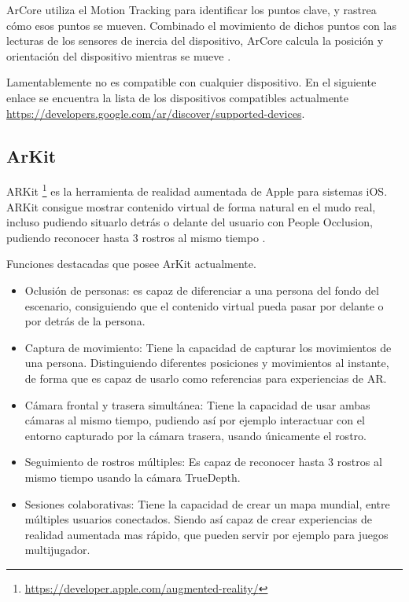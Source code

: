 ArCore utiliza el Motion Tracking para identificar los puntos clave, y rastrea cómo esos puntos se mueven. Combinado el movimiento de dichos puntos con  las lecturas de los sensores de inercia del dispositivo, ArCore calcula la posición y orientación del dispositivo mientras se mueve \cite{google}.

Lamentablemente no es compatible con cualquier dispositivo. En el siguiente enlace se encuentra la lista de los dispositivos compatibles actualmente \url{https://developers.google.com/ar/discover/supported-devices}.

\subsection{ArKit}
ARKit \footnote{\url{https://developer.apple.com/augmented-reality/}} es la herramienta de realidad aumentada de Apple para sistemas iOS. ARKit consigue mostrar contenido virtual de forma natural en el mudo real, incluso pudiendo situarlo detrás o delante del usuario con People Occlusion, pudiendo reconocer hasta 3 rostros al mismo tiempo \cite{apple_inc}.

Funciones destacadas que posee ArKit actualmente.
\begin{itemize}
	\item Oclusión de personas: es capaz de diferenciar a una persona del fondo del escenario, consiguiendo que el contenido virtual  pueda pasar por delante o por detrás de la persona.
	\item Captura de movimiento: Tiene la capacidad de capturar los movimientos de una persona. Distinguiendo diferentes posiciones y movimientos al instante, de forma que es capaz de usarlo como referencias para experiencias de AR.
	\item Cámara frontal y trasera simultánea: Tiene la capacidad de usar ambas cámaras al mismo tiempo, pudiendo así por ejemplo interactuar con el entorno capturado por la cámara trasera, usando únicamente el rostro.
	\item Seguimiento de rostros múltiples: Es capaz de reconocer hasta 3 rostros al mismo tiempo usando la cámara TrueDepth.
	\item Sesiones colaborativas: Tiene la capacidad de crear un mapa mundial, entre múltiples usuarios conectados. Siendo así capaz de crear experiencias de realidad aumentada mas rápido, que pueden servir por ejemplo para juegos multijugador.
\end{itemize}



